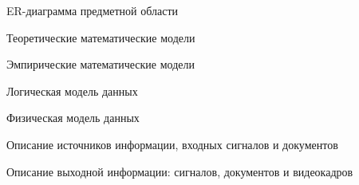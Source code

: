 \documentclass{beamer}
\begin{document}
\begin{frame}
	{ER-диаграмма предметной области}
\end{frame}

\begin{frame}
	{Теоретические математические модели}
\end{frame}

\begin{frame}
	{Эмпирические математические модели}
\end{frame}

\begin{frame}
	{Логическая модель данных}
\end{frame}

\begin{frame}
	{Физическая модель данных}
\end{frame}

\begin{frame}
	{Описание источников информации, входных сигналов и документов}
\end{frame}

\begin{frame}
	{Описание выходной информации: сигналов, документов и видеокадров}
\end{frame}
\end{document}
